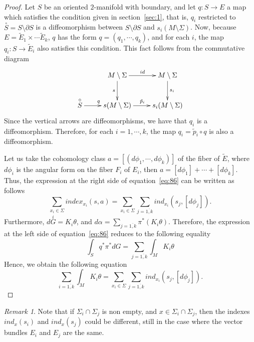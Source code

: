 \documentclass[12pt,letterpaper]{amsart}
\theoremstyle{definition}
\theoremstyle{plain}
\theoremstyle{remark}
\newtheorem{rem}{Remark}
\begin{document}
\begin{proof}
Let $S$ be an oriented $2$-manifold with boundary, and let $q: S \rightarrow E$ a map which satisfies the condition given in section~\ref{sec:1}, that is, $q_i$ restricted to $\overset{\circ}{S} = S \setminus \partial S$ is a diffeomorphism between $S \setminus \partial S$ and $s_i(M \setminus \Sigma)$.
Now, because $E=\tilde{E}_1 \times \cdots \tilde{E}_k$, $q$ has the form $q=(q_1, \cdots, q_k)$, and for each $i$, the map $q_i: S\rightarrow \tilde{E}_i$ also satisfies this condition.
This fact follows from the commutative diagram
\begin{equation}
\xymatrix{
& M\setminus \Sigma \ar[r]^{id} \ar[d]_{s} & M\setminus \Sigma \ar[d]^{s_i}\\
\overset{\circ}{S}\ar[r]^{q} & s(M\setminus \Sigma)\ar[r]^{\tilde{p}_i} & s_i(M\setminus \Sigma)
}
\label{eq:90}
\end{equation}
Since the vertical arrows are diffeomorphisms, we have that $q_i$ is a diffeomorphism.
Therefore, for each $i = 1,\cdots, k$, the map $q_i=\tilde{p}_i\circ q$ is also a diffeomorphism.


Let us take the cohomology class $a=[(d\phi_1, \cdots, d\phi_k)]$ of the fiber of $\tilde{E}$, where $d\phi_i$ is the angular form on the fiber $F_i$ of $E_i$, then $a=[d\phi_1]+ \cdots +[d\phi_k]$.
Thus, the expression at the right side of equation~\eqref{eq:86} can be written as follows
\begin{equation}
\sum_{x_i \in \Sigma} index_{x_i}(s,a)=\sum_{x_i \in \Sigma} \sum_{j=\overline{1, k}}ind_{x_i}(s_j, [d\phi_j]).
\label{eq:91}
\end{equation}
Furthermore, $d\overset{i}{G}=K_i \theta$, and $d\alpha =\sum_{j=\overline{1, k}} \pi^{*}(K_i \theta)$.
Therefore, the expression at the left side of equation~\eqref{eq:86} reduces to the following equality
\begin{equation}
\int_S q^{*}\pi^{*}dG=\sum_{j=\overline{1, k}}\int_M K_i \theta
\label{eq:92}
\end{equation}
Hence, we obtain the following equation
\begin{equation}
\sum_{i=\overline{1, k}}\int_M K_i \theta = \sum_{x_i \in \Sigma} \sum_{j=\overline{1, k}}ind_{x_i}(s_j, [d\phi_j]).
\label{eq:93}
\end{equation}
\end{proof}

\begin{rem}
Note that if $\Sigma_i \cap \Sigma_j$ is non empty, and $x\in \Sigma_i \cap \Sigma_j$, then the indexes $ind_x(s_i)$ and $ind_x(s_j)$ could be different, still in the case where the vector bundles $E_i$ and $E_j$ are the same.
\label{rem:11}
\end{rem}
\end{document}
